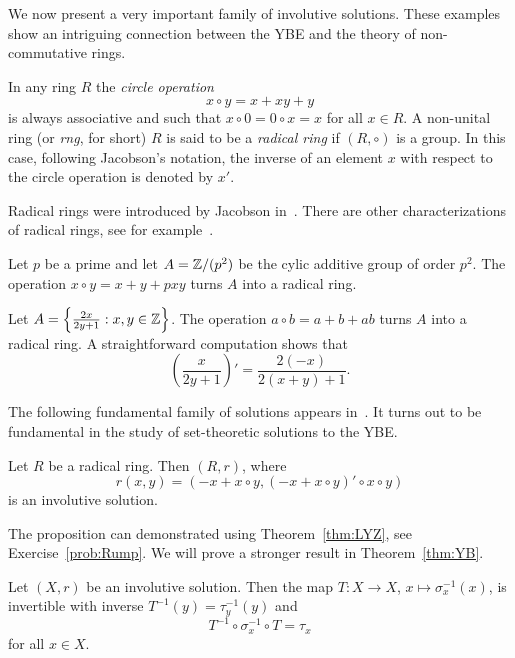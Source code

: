 We now present a very important family of involutive solutions. 
These examples show an intriguing connection between the YBE and the 
theory of non-commutative rings. 


In any ring $R$ the \emph{circle operation} 
\[
x\circ y=x+xy+y
\]
is always associative and such that $x\circ 0=0\circ x=x$ for all $x\in R$. 
A non-unital ring (or \emph{rng}, for short) 
$R$ is said to be a \emph{radical ring} if $(R,\circ)$ is a group. 
In this case, following Jacobson's notation, the inverse of 
an element $x$ with respect to the circle operation is denoted by $x'$. 

Radical rings were introduced by Jacobson in~\cite{MR12271}.
There are other characterizations of radical rings, see for example~\cite{MR3308118}.

\begin{example}
Let $p$ be a prime and let $A=\mathbb{Z}/(p^2)$ be the cylic additive group of order $p^2$. 
The operation $x\circ y=x+y+pxy$ 
turns $A$ into a radical ring. 
\end{example}

\begin{example}
Let $A=\left\{\frac{2x}{2y+1}:x,y\in\mathbb{Z}\right\}$. The operation 
$a\circ b=a+b+ab$ turns $A$ into a radical ring. A straightforward computation shows that 
\[
\left(\frac{x}{2y+1}\right)'=\frac{2(-x)}{2(x+y)+1}.
\]
\end{example}

The following fundamental family of solutions appears in~\cite{MR2278047}. 
It turns out to be fundamental in the study of 
set-theoretic solutions to the YBE. 

\begin{proposition}
\label{pro:Rump}
Let $R$ be a radical ring. Then $(R,r)$, where 
\[
r(x,y)=( -x+x\circ y,(-x+x\circ y)'\circ x\circ y)
\]
is an involutive solution.
\end{proposition}

The proposition can demonstrated using Theorem~\ref{thm:LYZ}, 
see Exercise~\ref{prob:Rump}. 
We will prove a stronger result in Theorem~\ref{thm:YB}. 

\begin{proposition}
\label{pro:T}
Let $(X,r)$ be an involutive solution. 
Then the map $T\colon X\to X$, $x\mapsto\sigma_x^{-1}(x)$, is 
invertible with inverse $T^{-1}(y)=\tau^{-1}_y(y)$ and 
\[
T^{-1}\circ\sigma_x^{-1}\circ T=\tau_x
\]
for all $x\in X$. 
\end{proposition}

